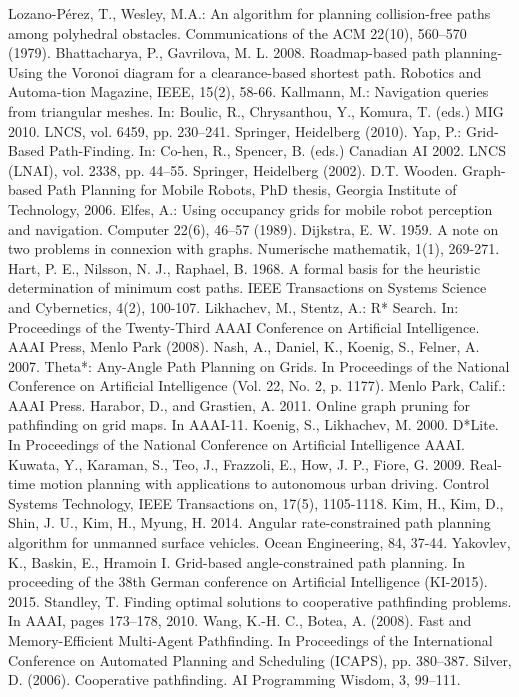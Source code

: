\documentclass[runningheads,a4paper]{llncs}
\begin{document}
\begin{thebibliography}{4}
 Lozano-Pérez, T., Wesley, M.A.: An algorithm for planning collision-free paths among polyhedral obstacles. Communications of the ACM 22(10), 560–570 (1979).
 Bhattacharya, P., Gavrilova, M. L. 2008. Roadmap-based path planning-Using the Voronoi diagram for a clearance-based shortest path. Robotics and Automa-tion Magazine, IEEE, 15(2), 58-66. 
 Kallmann, M.: Navigation queries from triangular meshes. In: Boulic, R., Chrysanthou, Y., Komura, T. (eds.) MIG 2010. LNCS, vol. 6459, pp. 230–241. Springer, Heidelberg (2010).
 Yap, P.: Grid-Based Path-Finding. In: Co-hen, R., Spencer, B. (eds.) Canadian AI 2002. LNCS (LNAI), vol. 2338, pp. 44–55. Springer, Heidelberg (2002).
 D.T. Wooden. Graph-based Path Planning for Mobile Robots, PhD thesis, Georgia Institute of Technology, 2006.
 Elfes, A.: Using occupancy grids for mobile robot perception and navigation. Computer 22(6), 46–57 (1989).
 Dijkstra, E. W. 1959. A note on two problems in connexion with graphs. Numerische mathematik, 1(1), 269-271.
 Hart, P. E., Nilsson, N. J., Raphael, B. 1968. A formal basis for the heuristic determination of minimum cost paths. IEEE Transactions on Systems Science and Cybernetics, 4(2), 100-107.
 Likhachev, M., Stentz, A.: R* Search. In: Proceedings of the Twenty-Third AAAI Conference on Artificial Intelligence. AAAI Press, Menlo Park (2008).
 Nash, A., Daniel, K., Koenig, S., Felner, A. 2007. Theta*: Any-Angle Path Planning on Grids. In Proceedings of the National Conference on Artificial Intelligence (Vol. 22, No. 2, p. 1177). Menlo Park, Calif.: AAAI Press.
 Harabor, D., and Grastien, A. 2011. Online graph pruning for pathfinding on grid maps. In AAAI-11.
 Koenig, S., Likhachev, M. 2000. D*Lite. In Proceedings of the National Conference on Artificial Intelligence AAAI.
 Kuwata, Y., Karaman, S., Teo, J., Frazzoli, E., How, J. P., Fiore, G. 2009. Real-time motion planning with applications to autonomous urban driving. Control Systems Technology, IEEE Transactions on, 17(5), 1105-1118.
 Kim, H., Kim, D., Shin, J. U., Kim, H., Myung, H. 2014. Angular rate-constrained path planning algorithm for unmanned surface vehicles. Ocean Engineering, 84, 37-44.
 Yakovlev, K., Baskin, E., Hramoin I. Grid-based angle-constrained path planning. In proceeding of the 38th German conference on Artificial Intelligence (KI-2015). 2015.
 Standley, T. Finding optimal solutions to cooperative pathfinding problems. In AAAI, pages 173–178, 2010.
 Wang, K.-H. C., Botea, A. (2008). Fast and Memory-Efficient Multi-Agent Pathfinding. In Proceedings of the International Conference on Automated Planning and Scheduling (ICAPS), pp. 380–387.
 Silver, D. (2006). Cooperative pathfinding. AI Programming Wisdom, 3, 99–111.


\end{thebibliography}
\end{document}
